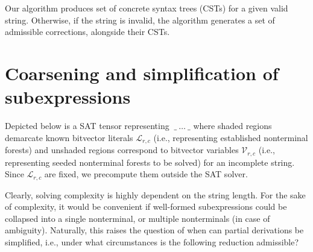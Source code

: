 \documentclass[sigplan,review,anonymous,acmsmall]{acmart}\settopmatter{printfolios=false,printccs=false,printacmref=false}
\begin{document}
Our algorithm produces set of concrete syntax trees (CSTs) for a given valid string. Otherwise, if the string is invalid, the algorithm generates a set of admissible corrections, alongside their CSTs.

\section{Coarsening and simplification of subexpressions}

Depicted below is a SAT tensor representing $\:\_\:\ldots\:\_$ where shaded regions demarcate known bitvector literals $\mathcal{L}_{r,c}$ (i.e., representing established nonterminal forests) and unshaded regions correspond to bitvector variables $\mathcal{V}_{r,c}$ (i.e., representing seeded nonterminal forests to be solved) for an incomplete string. Since $\mathcal{L}_{r,c}$ are fixed, we precompute them outside the SAT solver.

Clearly, solving complexity is highly dependent on the string length. For the sake of complexity, it would be convenient if well-formed subexpressions could be collapsed into a single nonterminal, or multiple nonterminals (in case of ambiguity). Naturally, this raises the question of when can partial derivations be simplified, i.e., under what circumstances is the following reduction admissible?
\end{document}
